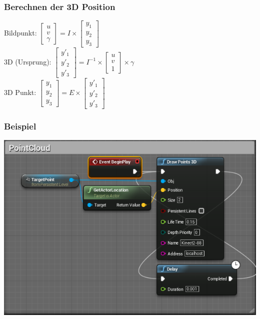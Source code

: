\documentclass[18pt]{beamer}
\begin{document}
\begin{frame}
	\frametitle{Berechnen der 3D Position} 
		Bildpunkt: 
		$\begin{bmatrix}
		u \\
		v \\
		\gamma
		\end{bmatrix}
		= 
		I
		\times
		\begin{bmatrix}
		y_1 \\
		y_2 \\
		y_3
		\end{bmatrix}$\\

		3D (Ursprung): 
		$\begin{bmatrix}
		y'_1 \\
		y'_2 \\
		y'_3
		\end{bmatrix}
		= 
		I^{-1}
		\times
		\begin{bmatrix}
		u \\
		v \\
		1
		\end{bmatrix}
		\times
		\gamma
		$ \\[1cm]
			
		3D Punkt:
		$\begin{bmatrix}
		y_1 \\
		y_2 \\
		y_3
		\end{bmatrix}
		= 
		E
		\times
		\begin{bmatrix}
		y'_1 \\
		y'_2 \\
		y'_3
		\end{bmatrix}$
\end{frame}

\begin{frame}
	\begin{center}
		\frametitle{Beispiel} 
		\includegraphics[width=0.8\paperwidth]{img/CloudBP}
	\end{center}

\end{frame}
\end{document}
